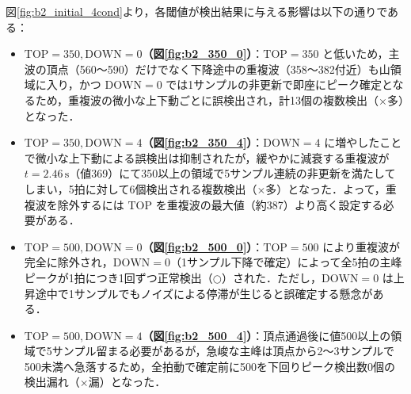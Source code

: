 図\ref{fig:b2_initial_4cond}より，各閾値が検出結果に与える影響は以下の通りである：
\begin{itemize}
  \item \textbf{$\mathrm{TOP} = 350, \mathrm{DOWN} = 0$（図\ref{fig:b2_350_0}）}：$\mathrm{TOP} = 350$ と低いため，主波の頂点（560〜590）だけでなく下降途中の重複波（358〜382付近）も山領域に入り，かつ $\mathrm{DOWN} = 0$ では1サンプルの非更新で即座にピーク確定となるため，重複波の微小な上下動ごとに誤検出され，計13個の複数検出（$\times$多）となった．
  \item \textbf{$\mathrm{TOP} = 350, \mathrm{DOWN} = 4$（図\ref{fig:b2_350_4}）}：$\mathrm{DOWN} = 4$ に増やしたことで微小な上下動による誤検出は抑制されたが，緩やかに減衰する重複波が $t = 2.46\,\mathrm{s}$（値369）にて350以上の領域で5サンプル連続の非更新を満たしてしまい，5拍に対して6個検出される複数検出（$\times$多）となった．よって，重複波を除外するには $\mathrm{TOP}$ を重複波の最大値（約387）より高く設定する必要がある．
  \item \textbf{$\mathrm{TOP} = 500, \mathrm{DOWN} = 0$（図\ref{fig:b2_500_0}）}：$\mathrm{TOP} = 500$ により重複波が完全に除外され，$\mathrm{DOWN} = 0$（1サンプル下降で確定）によって全5拍の主峰ピークが1拍につき1回ずつ正常検出（$\bigcirc$）された．ただし，$\mathrm{DOWN} = 0$ は上昇途中で1サンプルでもノイズによる停滞が生じると誤確定する懸念がある．
  \item \textbf{$\mathrm{TOP} = 500, \mathrm{DOWN} = 4$（図\ref{fig:b2_500_4}）}：頂点通過後に値500以上の領域で5サンプル留まる必要があるが，急峻な主峰は頂点から2〜3サンプルで500未満へ急落するため，全拍動で確定前に500を下回りピーク検出数0個の検出漏れ（$\times$漏）となった．
\end{itemize}

